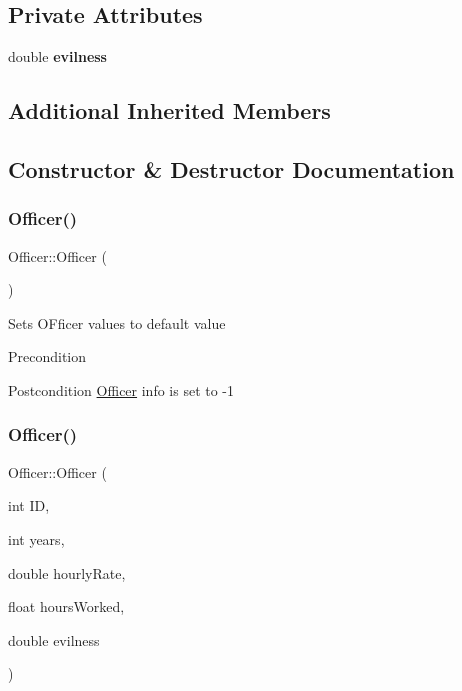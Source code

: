\subsection*{Private Attributes}
\begin{DoxyCompactItemize}
\item 
\mbox{\label{classOfficer_a63465c5f16e8148e5bc0a3bb4ecd1781}} 
double {\bfseries evilness}
\end{DoxyCompactItemize}
\subsection*{Additional Inherited Members}


\subsection{Constructor \& Destructor Documentation}
\mbox{\label{classOfficer_a80ac1e36a3f36c3a7e12b5dc9320ad89}} 
\subsubsection{\texorpdfstring{Officer()}{Officer()}\hspace{0.1cm}{\footnotesize\ttfamily [1/2]}}
{\footnotesize\ttfamily Officer\+::\+Officer (\begin{DoxyParamCaption}{ }\end{DoxyParamCaption})}

Sets O\+Fficer values to default value

\begin{DoxyPrecond}{Precondition}

\end{DoxyPrecond}
\begin{DoxyPostcond}{Postcondition}
\hyperlink{classOfficer}{Officer} info is set to -\/1 
\end{DoxyPostcond}
\mbox{\label{classOfficer_ac75c45d6e8628606278cb4ce6596f67f}} 
\subsubsection{\texorpdfstring{Officer()}{Officer()}\hspace{0.1cm}{\footnotesize\ttfamily [2/2]}}
{\footnotesize\ttfamily Officer\+::\+Officer (\begin{DoxyParamCaption}\item[{int}]{ID,  }\item[{int}]{years,  }\item[{double}]{hourly\+Rate,  }\item[{float}]{hours\+Worked,  }\item[{double}]{evilness }\end{DoxyParamCaption})}


